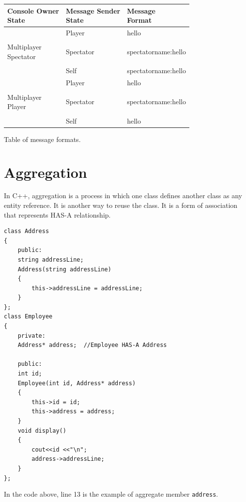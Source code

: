 \documentclass{article}
\theoremstyle{definition}
\newenvironment{dummy}{}{}
\begin{document}
\begin{tabcontainer}
 \begin{tabularx}{\textwidth}{| X | X | X |}
 \hline
 \makecell{Console Owner\\ State} & \makecell{Message Sender\\ State} & \makecell{Message \\ Format} \\ [0.5ex] 
 \hline\hline
 
\makecell{Multiplayer \\Spectator} & \makecell{Player\\ \\ Spectator \\ \\Self} & \makecell{hello \\  \\ spectatorname:hello \\ \\spectatorname:hello} \\
    \hline

\makecell{Multiplayer\\ Player} & \makecell{Player \\ \\ Spectator \\ \\Self} & \makecell{hello \\ \\ spectatorname:hello \\ \\hello} \\
    \hline
  \end{tabularx}
  \caption{Table of message formats.}
  \label{tab:messageform}
\end{tabcontainer}

\section{Aggregation}
\label{sec:aggregation}
In C++, aggregation is a process in which one class defines another class as any entity reference. It is another way to reuse the class. It is a form of association that represents HAS-A relationship.

\begin{dummy}
\begin{lstlisting}[frame=single]
class Address
{  
    public:
    string addressLine;
    Address(string addressLine)
    {    
        this->addressLine = addressLine;
    }
};
class Employee
{
    private:
    Address* address;  //Employee HAS-A Address

    public:
    int id;
    Employee(int id, Address* address)
    {
        this->id = id;
        this->address = address;
    }
    void display()
    {
        cout<<id <<"\n";
        address->addressLine;
    }
};
\end{lstlisting}
\end{dummy}
In the code above, line 13 is the example of aggregate member \texttt{address}.
\end{document}

